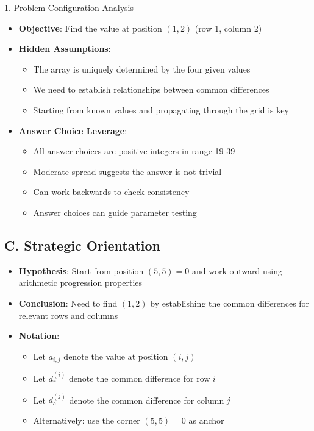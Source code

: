\documentclass[12pt]{article}
\begin{document}
\begin{configbox}{1. Problem Configuration Analysis}
\begin{itemize}[leftmargin=*]
    \item \textbf{Objective}: Find the value at position $(1, 2)$ (row 1, column 2)
    
    \item \textbf{Hidden Assumptions}: 
    \begin{itemize}
        \item The array is uniquely determined by the four given values
        \item We need to establish relationships between common differences
        \item Starting from known values and propagating through the grid is key
    \end{itemize}
    
    \item \textbf{Answer Choice Leverage}: 
    \begin{itemize}
        \item All answer choices are positive integers in range 19-39
        \item Moderate spread suggests the answer is not trivial
        \item Can work backwards to check consistency
        \item Answer choices can guide parameter testing
    \end{itemize}
\end{itemize}

\subsection*{C. Strategic Orientation}
\begin{itemize}[leftmargin=*]
    \item \textbf{Hypothesis}: Start from position $(5,5) = 0$ and work outward using arithmetic progression properties
    
    \item \textbf{Conclusion}: Need to find $(1,2)$ by establishing the common differences for relevant rows and columns
    
    \item \textbf{Notation}: 
    \begin{itemize}
        \item Let $a_{i,j}$ denote the value at position $(i,j)$
        \item Let $d_r^{(i)}$ denote the common difference for row $i$
        \item Let $d_c^{(j)}$ denote the common difference for column $j$
        \item Alternatively: use the corner $(5,5) = 0$ as anchor
    \end{itemize}
    

\end{itemize}
\end{configbox}
\end{document}
